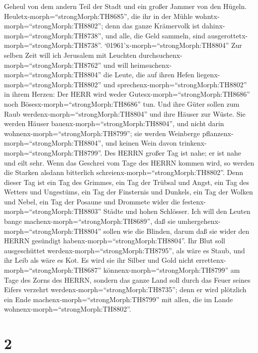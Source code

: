 Geheul von dem andern Teil der Stadt und ein großer Jammer von den
Hügeln.  Heuletx-morph=``strongMorph:TH8685'', die ihr in
der Mühle wohntx-morph=``strongMorph:TH8802''; denn das ganze Krämervolk
ist dahinx-morph=``strongMorph:TH8738'', und alle, die Geld sammeln,
sind ausgerottetx-morph=``strongMorph:TH8738''. 
`01961'\textbar x-morph=``strongMorph:TH8804'' Zur selben Zeit will ich
Jerusalem mit Leuchten durchsuchenx-morph=``strongMorph:TH8762'' und
will heimsuchenx-morph=``strongMorph:TH8804'' die Leute, die auf ihren
Hefen liegenx-morph=``strongMorph:TH8802'' und
sprechenx-morph=``strongMorph:TH8802'' in ihrem Herzen: Der HERR wird
weder Gutesx-morph=``strongMorph:TH8686'' noch
Bösesx-morph=``strongMorph:TH8686'' tun.  Und ihre Güter
sollen zum Raub werdenx-morph=``strongMorph:TH8804'' und ihre Häuser zur
Wüste. Sie werden Häuser bauenx-morph=``strongMorph:TH8804'', und nicht
darin wohnenx-morph=``strongMorph:TH8799''; sie werden Weinberge
pflanzenx-morph=``strongMorph:TH8804'', und keinen Wein davon
trinkenx-morph=``strongMorph:TH8799''.  Des HERRN großer
Tag ist nahe; er ist nahe und eilt sehr. Wenn das Geschrei vom Tage des
HERRN kommen wird, so werden die Starken alsdann bitterlich
schreienx-morph=``strongMorph:TH8802''.  Denn dieser Tag
ist ein Tag des Grimmes, ein Tag der Trübsal und Angst, ein Tag des
Wetters und Ungestüms, ein Tag der Finsternis und Dunkels, ein Tag der
Wolken und Nebel,  ein Tag der Posaune und Drommete wider
die festenx-morph=``strongMorph:TH8803'' Städte und hohen Schlösser.
 Ich will den Leuten bange
machenx-morph=``strongMorph:TH8689'', daß sie
umhergehenx-morph=``strongMorph:TH8804'' sollen wie die Blinden, darum
daß sie wider den HERRN gesündigt habenx-morph=``strongMorph:TH8804''.
Ihr Blut soll ausgeschüttet werdenx-morph=``strongMorph:TH8795'', als
wäre es Staub, und ihr Leib als wäre es Kot.  Es wird sie
ihr Silber und Gold nicht errettenx-morph=``strongMorph:TH8687''
könnenx-morph=``strongMorph:TH8799'' am Tage des Zorns des HERRN,
sondern das ganze Land soll durch das Feuer seines Eifers verzehrt
werdenx-morph=``strongMorph:TH8735''; denn er wird plötzlich ein Ende
machenx-morph=``strongMorph:TH8799'' mit allen, die im Lande
wohnenx-morph=``strongMorph:TH8802''.

\hypertarget{section-1}{%
\section{2}\label{section-1}}

